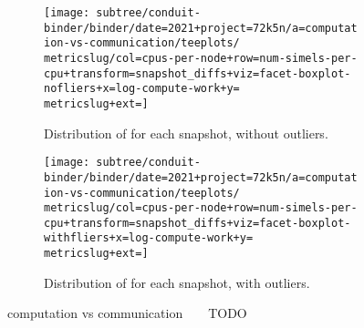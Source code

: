 \begin{figure*}
  \centering
  \begin{subfigure}[b]{0.5\textwidth}
    \centering
    \texttt{[image: subtree/conduit-binder/binder/date=2021+project=72k5n/a=computation-vs-communication/teeplots/\\metricslug/col=cpus-per-node+row=num-simels-per-cpu+transform=snapshot\_diffs+viz=facet-boxplot-nofliers+x=log-compute-work+y=\\metricslug+ext=]}
    \caption{Distribution of \metric for each snapshot, without outliers.}
    \label{fig:computation-vs-communication-distribution-\metricslug-nofliers}
  \end{subfigure}%
  \begin{subfigure}[b]{0.5\textwidth}
    \centering
    \texttt{[image: subtree/conduit-binder/binder/date=2021+project=72k5n/a=computation-vs-communication/teeplots/\\metricslug/col=cpus-per-node+row=num-simels-per-cpu+transform=snapshot\_diffs+viz=facet-boxplot-withfliers+x=log-compute-work+y=\\metricslug+ext=]}
    \caption{Distribution of \metric for each snapshot, with outliers.}
    \label{fig:computation-vs-communication-distribution-\metricslug-withfliers}
  \end{subfigure}
  \caption{computation vs communication ~ \metric ~ TODO}
  \label{fig:computation-vs-communication-distribution-\metricslug}
\end{figure*}
